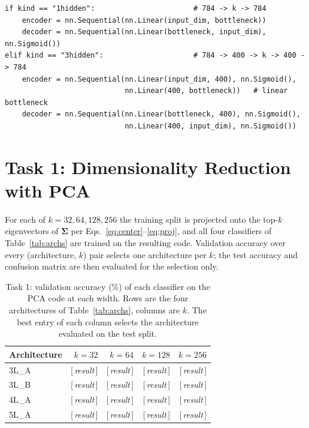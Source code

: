 \documentclass[11pt,a4paper]{article}
\newcommand{\code}[1]{\texttt{#1}}
\newcommand{\RESULT}{\textrm{[\,\textit{result}\,]}}     %
\begin{document}
\begin{lstlisting}[caption={Autoencoder construction (models.py).  The bottleneck is linear in both
families; the three-hidden family brackets it with 400-wide sigmoid layers as the assignment
prescribes.  The same single \code{nn.Linear(784,$k$)} encoder is reused, with a masking
corruption of Eq.~\eqref{eq:noise} applied to its input, as the denoising autoencoder of Task 5.},
label={lst:ae}]
if kind == "1hidden":                       # 784 -> k -> 784
    encoder = nn.Sequential(nn.Linear(input_dim, bottleneck))
    decoder = nn.Sequential(nn.Linear(bottleneck, input_dim), nn.Sigmoid())
elif kind == "3hidden":                     # 784 -> 400 -> k -> 400 -> 784
    encoder = nn.Sequential(nn.Linear(input_dim, 400), nn.Sigmoid(),
                            nn.Linear(400, bottleneck))   # linear bottleneck
    decoder = nn.Sequential(nn.Linear(bottleneck, 400), nn.Sigmoid(),
                            nn.Linear(400, input_dim), nn.Sigmoid())
\end{lstlisting}

\section{Task 1: Dimensionality Reduction with PCA}\label{sec:task1}
For each of $k=32,64,128,256$ the training split is projected onto the top-$k$ eigenvectors of
$\boldsymbol{\Sigma}$ per Eqs.~\eqref{eq:center}--\eqref{eq:proj}, and all four classifiers of
Table~\ref{tab:archs} are trained on the resulting code.  Validation accuracy over every
(architecture, $k$) pair selects one architecture per $k$; the test accuracy and confusion matrix
are then evaluated for the selection only.

\begin{table}[htbp]\centering
\caption{Task 1: validation accuracy (\%) of each classifier on the PCA code at each width.  Rows
are the four architectures of Table~\ref{tab:archs}, columns are $k$.  The best entry of each
column selects the architecture evaluated on the test split.}\label{tab:task1}
\begin{tabular}{@{}lrrrr@{}}
\toprule Architecture & $k=32$ & $k=64$ & $k=128$ & $k=256$ \\ \midrule
3L\_A & \RESULT & \RESULT & \RESULT & \RESULT \\
3L\_B & \RESULT & \RESULT & \RESULT & \RESULT \\
4L\_A & \RESULT & \RESULT & \RESULT & \RESULT \\
5L\_A & \RESULT & \RESULT & \RESULT & \RESULT \\
\bottomrule
\end{tabular}
\end{table}
\end{document}
